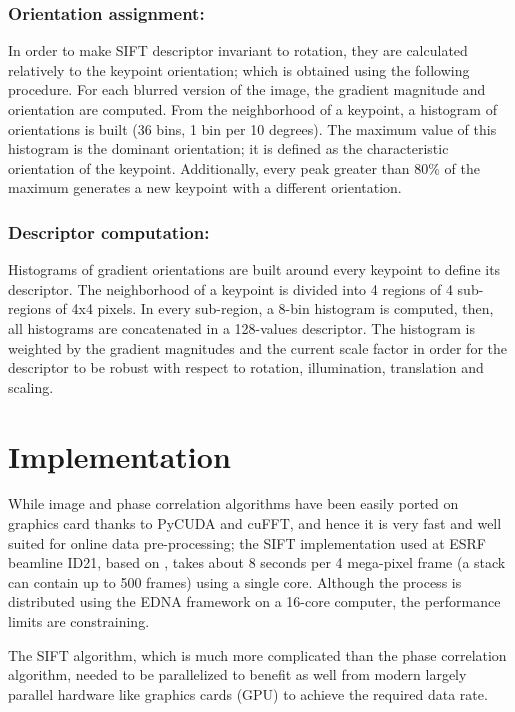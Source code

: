 \documentclass[preprint]{iucr}
\begin{document}
\subsubsection{Orientation assignment:}
In order to make SIFT descriptor invariant to rotation, they are calculated
relatively to the keypoint orientation; which is obtained using the following
procedure.
For each blurred version of the image, the gradient magnitude and orientation
are computed.
From the neighborhood of a keypoint, a histogram of orientations is built (36
bins, 1 bin per 10 degrees).
The maximum value of this histogram is the dominant orientation; it is defined
as the characteristic orientation of the keypoint.
Additionally, every peak greater than 80\% of the maximum generates a new
keypoint with a different orientation.



\subsubsection{Descriptor computation:}
Histograms of gradient orientations are built around every keypoint to define
its descriptor.
The neighborhood of a keypoint is divided into 4 regions of 4 sub-regions of 4x4
pixels.
In every sub-region, a 8-bin histogram is computed, then, all histograms
are concatenated in a 128-values descriptor.
The histogram is weighted by the gradient magnitudes and the current scale
factor in order for the descriptor to be robust with respect to rotation,
illumination, translation and scaling.


\section{Implementation}

While image and phase correlation algorithms have been easily ported on
graphics card thanks to PyCUDA \cite{pyopencl} and cuFFT, and hence it is very fast and well
suited for online data pre-processing;
the SIFT implementation used at ESRF beamline ID21, based on \cite{ASIFT},
takes about 8 seconds per 4 mega-pixel frame  (a stack can contain up to  500
frames) using a single core.
Although the process is distributed using the EDNA framework \cite{edna} on a
16-core computer, the performance limits are constraining.

The SIFT algorithm, which is much more complicated than the phase
correlation algorithm, needed to be parallelized to benefit as well from modern
largely parallel hardware like graphics cards (GPU) to achieve the required
data rate.
\end{document}
